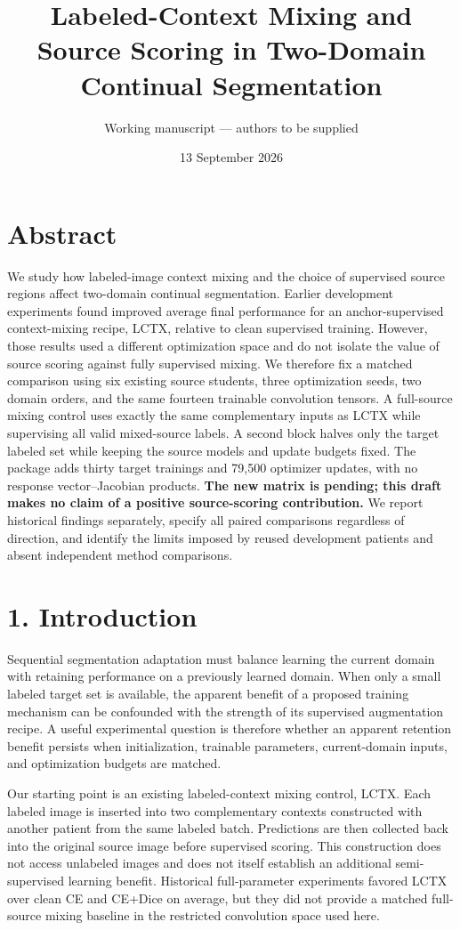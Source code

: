 \documentclass[
]{article}
\title{Labeled-Context Mixing and Source Scoring in Two-Domain Continual
Segmentation}
\author{Working manuscript --- authors to be supplied}
\date{13 September 2026}
\begin{document}
\maketitle

\section{Abstract}\label{abstract}

We study how labeled-image context mixing and the choice of supervised
source regions affect two-domain continual segmentation. Earlier
development experiments found improved average final performance for an
anchor-supervised context-mixing recipe, LCTX, relative to clean
supervised training. However, those results used a different
optimization space and do not isolate the value of source scoring
against fully supervised mixing. We therefore fix a matched comparison
using six existing source students, three optimization seeds, two domain
orders, and the same fourteen trainable convolution tensors. A
full-source mixing control uses exactly the same complementary inputs as
LCTX while supervising all valid mixed-source labels. A second block
halves only the target labeled set while keeping the source models and
update budgets fixed. The package adds thirty target trainings and
79,500 optimizer updates, with no response vector--Jacobian products.
\textbf{The new matrix is pending; this draft makes no claim of a
positive source-scoring contribution.} We report historical findings
separately, specify all paired comparisons regardless of direction, and
identify the limits imposed by reused development patients and absent
independent method comparisons.

\section{1. Introduction}\label{introduction}

Sequential segmentation adaptation must balance learning the current
domain with retaining performance on a previously learned domain. When
only a small labeled target set is available, the apparent benefit of a
proposed training mechanism can be confounded with the strength of its
supervised augmentation recipe. A useful experimental question is
therefore whether an apparent retention benefit persists when
initialization, trainable parameters, current-domain inputs, and
optimization budgets are matched.

Our starting point is an existing labeled-context mixing control, LCTX.
Each labeled image is inserted into two complementary contexts
constructed with another patient from the same labeled batch.
Predictions are then collected back into the original source image
before supervised scoring. This construction does not access unlabeled
images and does not itself establish an additional semi-supervised
learning benefit. Historical full-parameter experiments favored LCTX
over clean CE and CE+Dice on average, but they did not provide a matched
full-source mixing baseline in the restricted convolution space used
here.
\end{document}

